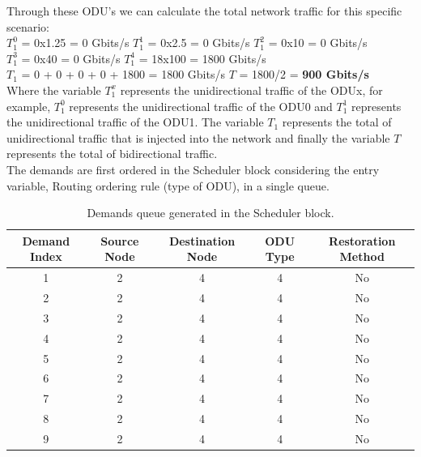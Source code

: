 \vspace{17pt}
Through these ODU's we can calculate the total network traffic for this specific scenario:\\

$T_1^0$ = 0x1.25 = 0 Gbits/s \qquad
$T_1^1$ = 0x2.5 = 0 Gbits/s \qquad
$T_1^2$ = 0x10 = 0 Gbits/s \\

$T_1^3$ = 0x40 = 0 Gbits/s \quad
$T_1^4$ = 18x100 = 1800 Gbits/s \\

$T_{1}$ = 0 + 0 + 0 + 0 + 1800 = 1800 Gbits/s \qquad
$T$ = 1800/2 = \textbf{900 Gbits/s}\\

Where the variable $T_1^x$ represents the unidirectional traffic of the ODUx, for example, $T_1^0$ represents the unidirectional traffic of the ODU0 and $T_1^1$ represents the unidirectional traffic of the ODU1. The variable $T_{1}$ represents the total of unidirectional traffic that is injected into the network and finally the variable $T$ represents the total of bidirectional traffic.\\

The demands are first ordered in the Scheduler block considering the entry variable, Routing ordering rule (type of ODU), in a single queue.

\begin{table}[H]
	\centering
	\begin{tabular}{| c | c | c | c | c |}
		
		\hline
		 Demand Index  & Source Node & Destination Node & ODU Type & Restoration Method \\
		\hline
		
		1 & 2 & 4 & 4 & No\\ \hline
		2 & 2 & 4 & 4 & No\\ \hline
		3 & 2 & 4 & 4 & No\\ \hline
		4 & 2 & 4 & 4 & No\\ \hline
		5 & 2 & 4 & 4 & No\\ \hline
		6 & 2 & 4 & 4 & No\\ \hline
		7 & 2 & 4 & 4 & No\\ \hline
		8 & 2 & 4 & 4 & No\\ \hline
		9 & 2 & 4 & 4 & No\\ \hline

	\end{tabular}
	\caption{Demands queue generated in the Scheduler block.}
	\label{scheduler_example}
\end{table} 

